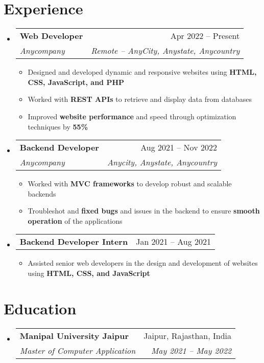 \documentclass[a4paper,11pt]{article}
\makeatletter
\newcommand{\resumeItem}[1]{
  \item\small{#1}
}
\newcommand{\resumeItemListStart}{\begin{itemize}[rightmargin=0.11in]}
\newcommand{\resumeItemListEnd}{\end{itemize}}
\newcommand{\resumeQuadHeading}[4]{
  \item
  \begin{tabular*}{0.96\textwidth}[t]{l@{\extracolsep{\fill}}r}
    \textbf{#1} & #2 \\
    \textit{\small#3} & \textit{\small #4} \\
  \end{tabular*}
}
\newcommand{\resumeQuadHeadingChild}[2]{
  \item
  \begin{tabular*}{0.96\textwidth}[t]{l@{\extracolsep{\fill}}r}
    \textbf{\small#1} & {\small#2} \\
  \end{tabular*}
}
\newcommand{\resumeHeadingListStart}{
  \begin{itemize}[leftmargin=0.15in, label={}]
}
\newcommand{\resumeHeadingListEnd}{\end{itemize}}
\makeatother
\begin{document}

\section{Experience}
\resumeHeadingListStart{}
  \resumeQuadHeading{Web Developer}{Apr 2022 -- Present}
  {Anycompany}{Remote -- AnyCity, Anystate, Anycountry}
    \resumeItemListStart{}
      \resumeItem{Designed and developed dynamic and responsive websites using \textbf{HTML, CSS, JavaScript, and PHP}}
      \resumeItem{Worked with \textbf{REST APIs} to retrieve and display data from databases}
      \resumeItem{Improved \textbf{website performance} and speed through optimization techniques by \textbf{55\%}}
    \resumeItemListEnd{}

  \resumeQuadHeading{Backend Developer}{Aug 2021 -- Nov 2022}
  {Anycompany}{Anycity, Anystate, Anycountry}
    \resumeItemListStart{}
      \resumeItem{Worked with \textbf{MVC frameworks} to develop robust and scalable backends}
      \resumeItem{Troubleshot and \textbf{fixed bugs} and issues in the backend to ensure \textbf{smooth operation} of the applications}
    \resumeItemListEnd{}

  \resumeQuadHeadingChild{Backend Developer Intern}{Jan 2021 -- Aug 2021}
    \resumeItemListStart{}
      \resumeItem{Assisted senior web developers in the design and development of websites using \textbf{HTML, CSS, and JavaScript}}
    \resumeItemListEnd{}
\resumeHeadingListEnd{}



\section{Education}
  \resumeHeadingListStart{}
    \resumeQuadHeading{Manipal University Jaipur}{Jaipur, Rajasthan, India}
    {Master of Computer Application}{May 2021 -- May 2022}
  \resumeHeadingListEnd{}


\end{document}

